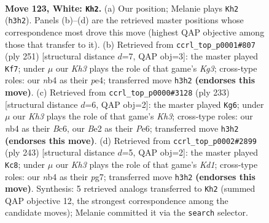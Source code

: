 \documentclass[11pt]{article}
\begin{document}
\clearpage

\begin{figure}[p]\centering
\begin{subfigure}{0.46\textwidth}\centering
\resizebox{\linewidth}{!}{%
\newchessgame
\chessboard[
  setfen={8/8/7k/6p1/1n6/7K/4B3/8 w - - 3 123},
  showmover=false,
  pgfstyle=straightmove, color=movearrow, markmove={h3-h2}
]}
\caption{}
\end{subfigure}\hfill
\begin{subfigure}{0.46\textwidth}\centering
\resizebox{\linewidth}{!}{%
\newchessgame
\chessboard[
  setfen={8/8/6k1/8/4P3/2B2P1b/5K2/8 b - - 76 126},
  showmover=false,
  pgfstyle=straightmove, color=movearrow, markmove={g6-f7}
]}
\caption{}
\end{subfigure}
\\[4pt]
\begin{subfigure}{0.46\textwidth}\centering
\resizebox{\linewidth}{!}{%
\newchessgame
\chessboard[
  setfen={8/8/2b1p2k/8/5P2/6K1/8/B7 b - - 0 117},
  showmover=false,
  pgfstyle=straightmove, color=movearrow, markmove={h6-g6}
]}
\caption{}
\end{subfigure}\hfill
\begin{subfigure}{0.46\textwidth}\centering
\resizebox{\linewidth}{!}{%
\newchessgame
\chessboard[
  setfen={3k4/6P1/3P4/4K3/8/1b6/5B2/8 b - - 28 122},
  showmover=false,
  pgfstyle=straightmove, color=movearrow, markmove={d8-c8}
]}
\caption{}
\end{subfigure}
\caption{\textbf{Move 123, White: \texttt{Kh2}.} (a) Our position; Melanie plays \texttt{Kh2} (\texttt{h3h2}). Panels (b)--(d) are the retrieved master positions whose correspondence most drove this move (highest QAP objective among those that transfer to it). (b) Retrieved from \texttt{ccrl\_top\_p0001\#807} (ply 251) [structural distance $d$=7, QAP obj=3]: the master played \texttt{Kf7}; under $\mu$ our \emph{Kh3} plays the role of that game's \emph{Kg3}; cross-type roles: our \emph{n}b4 as their \emph{p}e4; transferred move \texttt{h3h2} \textbf{(endorses this move)}. (c) Retrieved from \texttt{ccrl\_top\_p0000\#3128} (ply 233) [structural distance $d$=6, QAP obj=2]: the master played \texttt{Kg6}; under $\mu$ our \emph{Kh3} plays the role of that game's \emph{Kh3}; cross-type roles: our \emph{n}b4 as their \emph{B}c6, our \emph{B}e2 as their \emph{P}e6; transferred move \texttt{h3h2} \textbf{(endorses this move)}. (d) Retrieved from \texttt{ccrl\_top\_p0002\#2899} (ply 243) [structural distance $d$=5, QAP obj=2]: the master played \texttt{Kc8}; under $\mu$ our \emph{Kh3} plays the role of that game's \emph{Kd1}; cross-type roles: our \emph{n}b4 as their \emph{p}g7; transferred move \texttt{h3h2} \textbf{(endorses this move)}. Synthesis: 5 retrieved analogs transferred to \texttt{Kh2} (summed QAP objective 12, the strongest correspondence among the candidate moves); Melanie committed it via the \texttt{search} selector.}
\label{fig:thought-m244}
\end{figure}
\end{document}
